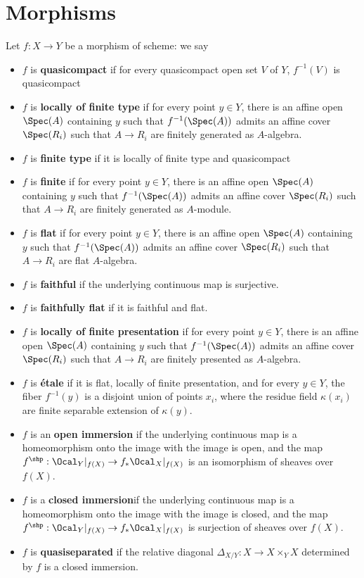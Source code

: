 \section{Morphisms}\label{sec:algebraicgeometry-morphisms}
\begin{definition}
    Let $f:X\to Y$ be a morphism of scheme: we say 
    \begin{itemize}
        \item $f$ is \textbf{quasicompact} if for every quasicompact open set $V$ of $Y$, $f^{-1}(V)$ is quasicompact
        \item $f$ is \textbf{locally of finite type} if for every point $y \in Y$, there is an affine open $\Spec(A)$ containing $y$ such that $f^{-1}(\Spec(A))$ admits an affine cover $\Spec(R_i)$ such that $A\to R_i$ are finitely generated as $A$-algebra.
        \item $f$ is \textbf{finite type} if it is locally of finite type and quasicompact
        \item $f$ is \textbf{finite} if for every point $y \in Y$, there is an affine open $\Spec(A)$ containing $y$ such that $f^{-1}(\Spec(A))$ admits an affine cover $\Spec(R_i)$ such that $A\to R_i$ are finitely generated as $A$-module.
        \item $f$ is \textbf{flat} if for every point $y \in Y$, there is an affine open $\Spec(A)$ containing $y$ such that $f^{-1}(\Spec(A))$ admits an affine cover $\Spec(R_i)$ such that $A\to R_i$ are flat $A$-algebra.
        \item $f$ is \textbf{faithful} if the underlying continuous map is surjective.
        \item $f$ is \textbf{faithfully flat} if it is faithful and flat.
        \item $f$ is \textbf{locally of finite presentation} if for every point $y \in Y$, there is an affine open $\Spec(A)$ containing $y$ such that $f^{-1}(\Spec(A))$ admits an affine cover $\Spec(R_i)$ such that $A\to R_i$ are finitely presented as $A$-algebra.
        \item $f$ is \textbf{étale} if it is flat, locally of finite presentation, and for every $y\in Y$, the fiber $f^{-1}(y)$ is a disjoint union of points $x_i$, where the residue field $\kappa(x_i)$ are finite separable extension of $\kappa(y)$.
        \item $f$ is an \textbf{open immersion} if the underlying continuous map is a homeomorphism onto the image with the image is open, and the map $f^{\shp}: \Ocal_{Y}|_{f(X)}\to f_*\Ocal_{X}|_{f(X)}$ is an isomorphism of sheaves over $f(X)$.
        \item $f$ is a \textbf{closed immersion}if the underlying continuous map is a homeomorphism onto the image with the image is closed, and the map $f^{\shp}: \Ocal_{Y}|_{f(X)}\to f_*\Ocal_{X}|_{f(X)}$ is  surjection of sheaves over $f(X)$.
        \item $f$ is \textbf{quasiseparated} if the relative diagonal $\Delta_{X/Y}:X\to X\times _Y X$ determined by $f$ is a closed immersion.
    \end{itemize}
\end{definition}

